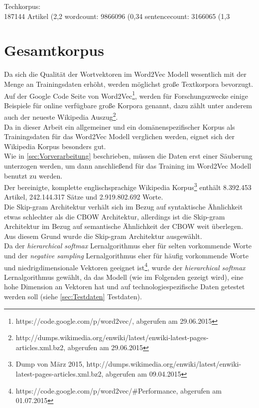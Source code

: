 \documentclass[12pt,a4paper]{report}
\begin{document}
	
	Techkorpus:\\
	187144 Artikel (2,2%
	wordcount: 9866096 (0,34%
	sentencecount: 3166065 (1,3%
\fi
	\section{Gesamtkorpus}
	\label{sec:Gesamtkorpus}
	Da sich die Qualität  der Wortvektoren im Word2Vec Modell wesentlich mit der Menge an Trainingsdaten erhöht\citep{DBLP:journals/corr/abs-1301-3781}, werden möglichst große Textkorpora bevorzugt. Auf der Google Code Seite von Word2Vec\footnote{https://code.google.com/p/word2vec/, abgerufen am 29.06.2015}, werden für Forschungszwecke einige Beispiele für online verfügbare große Korpora genannt, dazu zählt unter anderem auch der neueste Wikipedia Auszug\footnote{http://dumps.wikimedia.org/enwiki/latest/enwiki-latest-pages-articles.xml.bz2, abgerufen am 29.06.2015}.\\
	Da in dieser Arbeit ein allgemeiner und ein domänenspezifischer Korpus als Trainingsdaten für das Word2Vec Modell verglichen werden, eignet sich der Wikipedia Korpus besonders gut. \\
	Wie in \ref{sec:Vorverarbeitung} beschrieben, müssen die Daten erst einer Säuberung unterzogen werden, um dann anschließend für das Training im Word2Vec Modell benutzt zu werden.\\
	 Der bereinigte, komplette englischsprachige Wikipedia Korpus\footnote{Dump von März 2015, http://dumps.wikimedia.org/enwiki/latest/enwiki-latest-pages-articles.xml.bz2, abgerufen am 09.04.2015} enthält 8.392.453 Artikel, 242.144.317 Sätze und 2.919.802.692 Worte.\\


Die Skip-gram Architektur verhält sich im Bezug auf syntaktische Ähnlichkeit etwas schlechter als die CBOW Architektur, allerdings ist die Skip-gram Architektur im Bezug auf semantische Ähnlichkeit der CBOW weit überlegen\citep{DBLP:journals/corr/abs-1301-3781}.\\ Aus diesem Grund wurde die Skip-gram Architektur ausgewählt.\\
Da der \textit{hierarchical softmax} Lernalgorithmus eher für selten vorkommende Worte und der \textit{negative sampling} Lernalgorithmus eher für häufig vorkommende Worte und niedrigdimensionale Vektoren geeignet ist\footnote{https://code.google.com/p/word2vec/\#Performance, abgerufen am 01.07.2015}, wurde der  \textit{hierarchical softmax} Lernalgorithmus gewählt, da das Modell (wie im Folgenden gezeigt wird), eine hohe Dimension an Vektoren hat und auf technologiespezifische Daten getestet werden soll (siehe \ref{sec:Testdaten} Testdaten).\\
\end{document}
